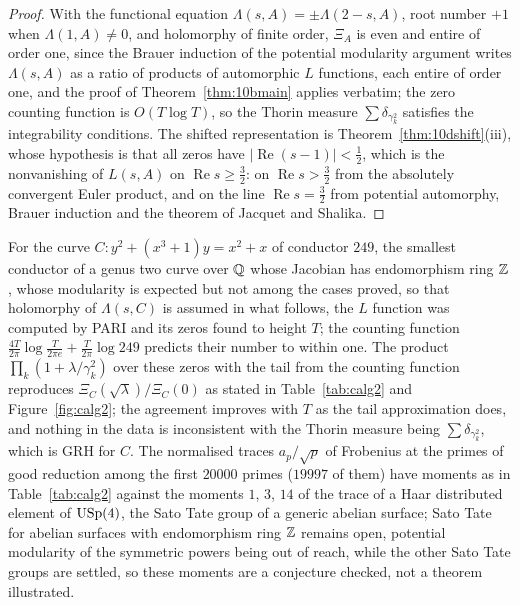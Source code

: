 \begin{proof}
With the functional equation $\Lambda(s,A)=\pm\Lambda(2-s,A)$, root number $+1$ when $\Lambda(1,A)\ne0$, and holomorphy of finite order, $\Xi_A$ is even and entire of order one, since the Brauer induction of the potential modularity argument writes $\Lambda(s,A)$ as a ratio of products of automorphic $L$ functions, each entire of order one, and the proof of Theorem~\ref{thm:10bmain} applies verbatim; the zero counting function is $O(T\log T)$, so the Thorin measure $\sum\delta_{\gamma_k^2}$ satisfies the integrability conditions. The shifted representation is Theorem~\ref{thm:10dshift}(iii), whose hypothesis is that all zeros have $|\operatorname{Re}(s-1)|<\frac12$, which is the nonvanishing of $L(s,A)$ on $\operatorname{Re}s\ge\frac32$: on $\operatorname{Re}s>\frac32$ from the absolutely convergent Euler product, and on the line $\operatorname{Re}s=\frac32$ from potential automorphy, Brauer induction and the theorem of Jacquet and Shalika.
\end{proof}

For the curve $C:y^2+(x^3+1)y=x^2+x$ of conductor $249$, the smallest conductor of a genus two curve over $\mathbb{Q}$ whose Jacobian has endomorphism ring $\mathbb{Z}$ \cite{lmfdb}, whose modularity is expected but not among the cases proved, so that holomorphy of $\Lambda(s,C)$ is assumed in what follows, the $L$ function was computed by PARI and its zeros found to height $T$; the counting function $\frac{4T}{2\pi}\log\frac T{2\pi e}+\frac T{2\pi}\log249$ predicts their number to within one. The product $\prod_k(1+\lambda/\gamma_k^2)$ over these zeros with the tail from the counting function reproduces $\Xi_C(\sqrt\lambda)/\Xi_C(0)$ as stated in Table~\ref{tab:calg2} and Figure~\ref{fig:calg2}; the agreement improves with $T$ as the tail approximation does, and nothing in the data is inconsistent with the Thorin measure being $\sum\delta_{\gamma_k^2}$, which is GRH for $C$. The normalised traces $a_p/\sqrt p$ of Frobenius at the primes of good reduction among the first $20000$ primes ($19997$ of them) have moments as in Table~\ref{tab:calg2} against the moments $1$, $3$, $14$ of the trace of a Haar distributed element of $\mathrm{USp}(4)$, the Sato Tate group of a generic abelian surface; Sato Tate for abelian surfaces with endomorphism ring $\mathbb{Z}$ remains open, potential modularity of the symmetric powers being out of reach, while the other Sato Tate groups are settled, so these moments are a conjecture checked, not a theorem illustrated.


